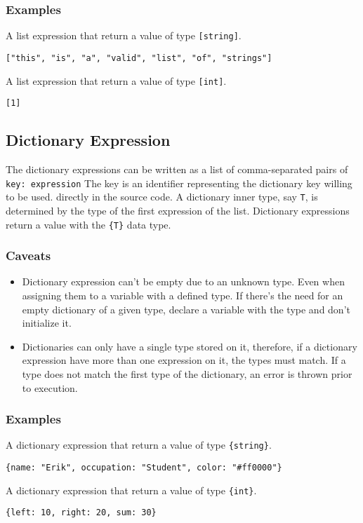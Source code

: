 \subsubsection{Examples}

A list expression that return a value of type \texttt{[string]}.
\begin{verbatim}
["this", "is", "a", "valid", "list", "of", "strings"]
\end{verbatim}
A list expression that return a value of type \texttt{[int]}.
\begin{verbatim}
[1]
\end{verbatim}

\subsection{Dictionary Expression}

The dictionary expressions can be written as a list of comma-separated pairs of \texttt{key: expression}
The key is an identifier representing the dictionary key willing to be used.
directly in the source code. A dictionary inner type, say \texttt{T}, is determined by the type of the first expression of the list.
Dictionary expressions return a value with the \texttt{\{T\}} data type.

\subsubsection{Caveats}

\begin{itemize}
    \item Dictionary expression can't be empty due to an unknown type. Even when assigning them to a variable with a defined type. If there's the
        need for an empty dictionary of a given type, declare a variable with the type and don't initialize it.
    \item Dictionaries can only have a single type stored on it, therefore, if a dictionary expression have more than one expression on it, the types
        must match. If a type does not match the first type of the dictionary, an error is thrown prior to execution.
\end{itemize}

\subsubsection{Examples}

A dictionary expression that return a value of type \texttt{\{string\}}.
\begin{verbatim}
{name: "Erik", occupation: "Student", color: "#ff0000"}
\end{verbatim}
A dictionary expression that return a value of type \texttt{\{int\}}.
\begin{verbatim}
{left: 10, right: 20, sum: 30}
\end{verbatim}

